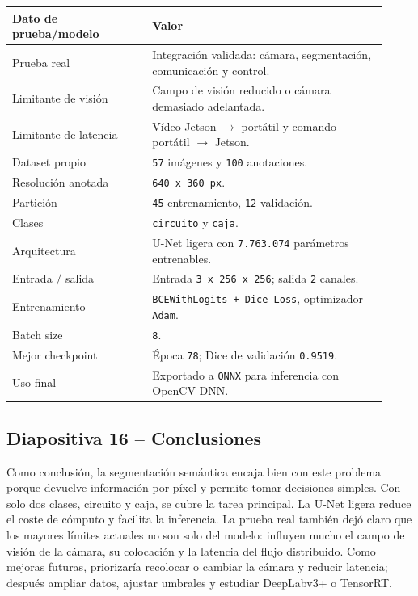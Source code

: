 \documentclass[a4paper,11pt]{article}
\begin{document}
\begin{center}
\centering
\footnotesize
\begin{tabular}{@{}L{0.34\linewidth}L{0.58\linewidth}@{}}
\toprule
\textbf{Dato de prueba/modelo} & \textbf{Valor} \\
\midrule
Prueba real & Integraci\'on validada: c\'amara, segmentaci\'on, comunicaci\'on y control. \\
Limitante de visi\'on & Campo de visi\'on reducido o c\'amara demasiado adelantada. \\
Limitante de latencia & V\'ideo Jetson $\rightarrow$ port\'atil y comando port\'atil $\rightarrow$ Jetson. \\
Dataset propio & \texttt{57} im\'agenes y \texttt{100} anotaciones. \\
Resoluci\'on anotada & \texttt{640 x 360 px}. \\
Partici\'on & \texttt{45} entrenamiento, \texttt{12} validaci\'on. \\
Clases & \texttt{circuito} y \texttt{caja}. \\
Arquitectura & U-Net ligera con \texttt{7.763.074} par\'ametros entrenables. \\
Entrada / salida & Entrada \texttt{3 x 256 x 256}; salida \texttt{2} canales. \\
Entrenamiento & \texttt{BCEWithLogits + Dice Loss}, optimizador \texttt{Adam}. \\
Batch size & \texttt{8}. \\
Mejor checkpoint & \'Epoca \texttt{78}; Dice de validaci\'on \texttt{0.9519}. \\
Uso final & Exportado a \texttt{ONNX} para inferencia con OpenCV DNN. \\
\bottomrule
\end{tabular}
\end{center}

\subsection*{Diapositiva 16 -- Conclusiones}
Como conclusi\'on, la segmentaci\'on sem\'antica encaja bien con este problema porque devuelve informaci\'on por p\'ixel y permite tomar decisiones simples. Con solo dos clases, circuito y caja, se cubre la tarea principal. La U-Net ligera reduce el coste de c\'omputo y facilita la inferencia. La prueba real tambi\'en dej\'o claro que los mayores l\'imites actuales no son solo del modelo: influyen mucho el campo de visi\'on de la c\'amara, su colocaci\'on y la latencia del flujo distribuido. Como mejoras futuras, priorizar\'ia recolocar o cambiar la c\'amara y reducir latencia; despu\'es ampliar datos, ajustar umbrales y estudiar DeepLabv3+ o TensorRT.
\end{document}
